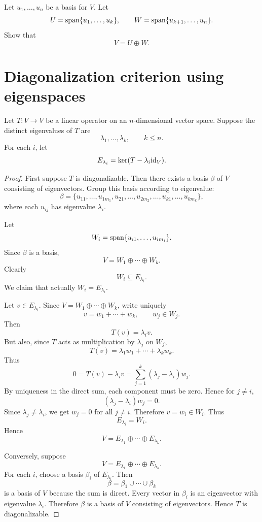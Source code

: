 \documentclass[11pt,openany]{article}
\begin{document}
\begin{exercise}
	Let $u_1,\dots,u_n$ be a basis for $V$.  Let
	\[
	U=\operatorname{\normalfont span}\{u_1,\dots,u_k\},
	\qquad
	W=\operatorname{\normalfont span}\{u_{k+1},\dots,u_n\}.
	\]
	Show that
	\[
	V=U\oplus W.
	\]
\end{exercise}

\section*{Diagonalization criterion using eigenspaces}

Let $T:V\to V$ be a linear operator on an $n$-dimensional vector space.  Suppose the distinct eigenvalues of $T$ are
\[
\lambda_1,\dots,\lambda_k,
\qquad k\leq n.
\]
For each $i$, let
\[
E_{\lambda_i}=\ker(T-\lambda_i\textnormal{id}_V).
\]

\begin{proof}
	First suppose $T$ is diagonalizable.  Then there exists a basis $\beta$ of $V$ consisting of eigenvectors.  Group this basis according to eigenvalue:
	\[
	\beta=
	\{u_{11},\dots,u_{1m_1},
	u_{21},\dots,u_{2m_2},
	\dots,
	u_{k1},\dots,u_{km_k}\},
	\]
	where each $u_{ij}$ has eigenvalue $\lambda_i$.
	
	Let
	\[
	W_i=\operatorname{\normalfont span}\{u_{i1},\dots,u_{im_i}\}.
	\]
	Since $\beta$ is a basis,
	\[
	V=W_1\oplus\cdots\oplus W_k.
	\]
	Clearly
	\[
	W_i\subseteq E_{\lambda_i}.
	\]
	We claim that actually $W_i=E_{\lambda_i}$.
	
	Let $v\in E_{\lambda_i}$.  Since $V=W_1\oplus\cdots\oplus W_k$, write uniquely
	\[
	v=w_1+\cdots+w_k,
	\qquad
	w_j\in W_j.
	\]
	Then
	\[
	T(v)=\lambda_i v.
	\]
	But also, since $T$ acts as multiplication by $\lambda_j$ on $W_j$,
	\[
	T(v)=\lambda_1w_1+\cdots+\lambda_kw_k.
	\]
	Thus
	\[
	0=T(v)-\lambda_i v
	=\sum_{j=1}^k(\lambda_j-\lambda_i)w_j.
	\]
	By uniqueness in the direct sum, each component must be zero.  Hence for $j\neq i$,
	\[
	(\lambda_j-\lambda_i)w_j=0.
	\]
	Since $\lambda_j\neq\lambda_i$, we get $w_j=0$ for all $j\neq i$.  Therefore $v=w_i\in W_i$.  Thus
	\[
	E_{\lambda_i}=W_i.
	\]
	Hence
	\[
	V=E_{\lambda_1}\oplus\cdots\oplus E_{\lambda_k}.
	\]
	
	Conversely, suppose
	\[
	V=E_{\lambda_1}\oplus\cdots\oplus E_{\lambda_k}.
	\]
	For each $i$, choose a basis $\beta_i$ of $E_{\lambda_i}$.  Then
	\[
	\beta=\beta_1\cup\cdots\cup\beta_k
	\]
	is a basis of $V$ because the sum is direct.  Every vector in $\beta_i$ is an eigenvector with eigenvalue $\lambda_i$.  Therefore $\beta$ is a basis of $V$ consisting of eigenvectors.  Hence $T$ is diagonalizable.
\end{proof}
\end{document}
